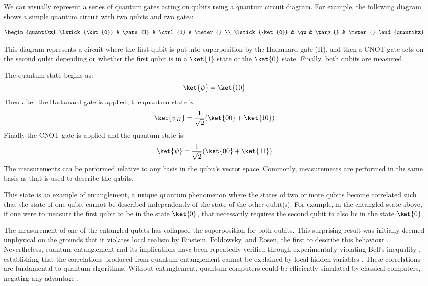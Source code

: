 We can visually represent a series of quantum gates acting on qubits using a quantum circuit diagram. For example, the following diagram shows a simple quantum circuit with two qubits and two gates:

$$\begin{quantikz}
    \lstick{\ket{0}} & \gate{H} & \ctrl{1} & \meter{} \\
    \lstick{\ket{0}} & \qw      & \targ{}  & \meter{}
\end{quantikz}$$

This diagram represents a circuit where the first qubit is put into superposition by the Hadamard gate (H), and then a CNOT gate acts on the second qubit depending on whether the first qubit is in a \(\ket{1}\) state or the \(\ket{0}\) state. Finally, both qubits are measured. 

The quantum state begins as:
$$\ket{\psi}=\ket{00}$$
Then after the Hadamard gate is applied, the quantum state is:
$$\ket{\psi_H}=\frac{1}{\sqrt{2}}(\ket{00} + \ket{10})$$
Finally the CNOT gate is applied and the quantum state is:
$$\ket{\psi} = \frac{1}{\sqrt{2}}(\ket{00} + \ket{11})$$
The measurements can be performed relative to any basis in the qubit's vector space. Commonly, measurements are performed in the same basis as that is used to describe the qubits.

This state is an example of entanglement, a unique quantum phenomenon where the states of two or more qubits become correlated such that the state of one qubit cannot be described independently of the state of the other qubit(s). For example, in the entangled state above, if one were to measure the first qubit to be in the state $\ket{0}$, that necessarily requires the second qubit to also be in the state $\ket{0}$. 

The measurement of one of the entangled qubits has collapsed the superposition for both qubits. This surprising result was initially deemed unphysical on the grounds that it violates local realism by Einstein, Poldowsky, and Rosen, the first to describe this behaviour \cite{epr_paradox}. Nevertheless, quantum entanglement and its implications have been repeatedly verified through experimentally violating Bell's inequality \cite{bell_theorem}, establishing that the correlations produced from quantum entanglement cannot be explained by local hidden variables \cite{bell_inequality_1,bell_inequality_2,bell_inequality_3}.
These correlations are fundamental to quantum algorithms. Without entanglement, quantum computers could be efficiently simulated by classical computers, negating any advantage \cite{Jozsa_2003}.

